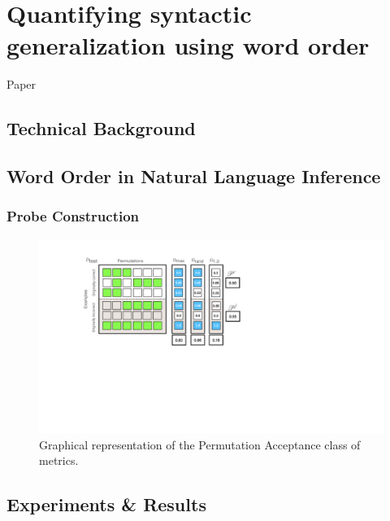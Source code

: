\documentclass[letterpaper, 12pt]{report}
\begin{document}
\chapter{Quantifying syntactic generalization using word order}
\label{sec:org4093e01}

Paper \cite{sinha2021a}

\section{Technical Background}
\label{sec:org27e141c}
\section{Word Order in Natural Language Inference}
\label{sec:org0bc8be0}
\subsection{Probe Construction}
\label{sec:org0679257}

\begin{figure}[htbp]
\centering
\includegraphics[height=0.3\textwidth]{figs/unli/nli_gen_perm_desc.pdf}
\caption{Graphical representation of the Permutation Acceptance class of metrics.}
\end{figure}

\section{Experiments \& Results}
\label{sec:org86be1bc}
\end{document}
